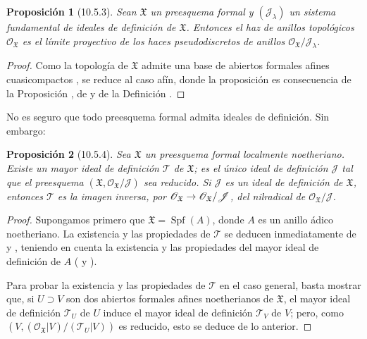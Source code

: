 \documentclass[oneside]{amsart}
\theoremstyle{ega-env-style}
\theoremstyle{ega-thm-env-style}
\newtheorem*{proposition}{Proposición}
\theoremstyle{ega-defn-env-style}
\renewcommand{\to}{\mathchoice{\longrightarrow}{\rightarrow}{\rightarrow}{\rightarrow}}
\let\EGAOriginalLabel\label
\renewcommand{\label}[1]{\phantomsection\EGAOriginalLabel{#1}}
\begin{document}
\begin{proposition}[10.5.3]
\label{I.10.5.3}
Sean $\mathfrak{X}$ un preesquema formal y $(\mathscr{J}_\lambda)$ un sistema fundamental de ideales de definición de $\mathfrak{X}$.
Entonces el haz de anillos topológicos $\mathscr{O}_{\mathfrak{X}}$ es el límite proyectivo de los haces pseudodiscretos de anillos  $\mathscr{O}_{\mathfrak{X}}/\mathscr{J}_\lambda$.
\end{proposition}

\begin{proof}
Como la topología de $\mathfrak{X}$ admite una base de abiertos formales afines cuasicompactos , se reduce al caso afín, donde la proposición es consecuencia de la Proposición , de  y de la Definición .
\end{proof}

No es seguro que todo preesquema formal admita ideales de definición.
Sin embargo:
\begin{proposition}[10.5.4]
\label{I.10.5.4}
Sea $\mathfrak{X}$ un preesquema formal localmente noetheriano.
Existe un mayor ideal de definición $\mathscr{T}$ de $\mathfrak{X}$; es el único ideal de definición $\mathscr{J}$ tal que el preesquema $(\mathfrak{X},\mathscr{O}_{\mathfrak{X}}/\mathscr{J})$ sea reducido.
Si $\mathscr{J}$ es un ideal de definición de $\mathfrak{X}$, entonces $\mathscr{T}$ es la imagen inversa, por $\mathscr{O}_{\mathfrak{X}}\to
\mathscr{O}_{\mathfrak{X}}/\mathscr{J}$, del nilradical de $\mathscr{O}_{\mathfrak{X}}/\mathscr{J}$.
\end{proposition}

\begin{proof}
Supongamos primero que $\mathfrak{X}=\operatorname{Spf}(A)$, donde $A$ es un anillo ádico noetheriano.
La existencia y las propiedades de $\mathscr{T}$ se deducen inmediatamente de  y , teniendo en cuenta la existencia y las propiedades del mayor ideal de definición de $A$ ( y ).

Para probar la existencia y las propiedades de $\mathscr{T}$ en el caso general, basta mostrar que, si $U\supset V$ son dos abiertos formales afines noetherianos de $\mathfrak{X}$, el mayor ideal de definición $\mathscr{T}_U$ de $U$ induce el mayor ideal de definición $\mathscr{T}_V$ de $V$; pero, como $(V,(\mathscr{O}_{\mathfrak{X}}|V)/(\mathscr{T}_U|V))$ es reducido, esto se deduce de lo anterior.
\end{proof}
\end{document}
